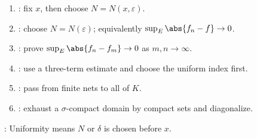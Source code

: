 \begin{method} \label{meth:uniform-convergence-proof-patterns-source-todo} 
\begin{enumerate}[label=(\roman*)]
\setlength{\itemsep}{0pt}
\item {}: fix $x$, then choose $N=N(x,\varepsilon)$.
\item {}: choose $N=N(\varepsilon)$; equivalently $\sup_E\abs{f_n-f}\to0$.
\item {}: prove $\sup_E\abs{f_n-f_m}\to0$ as $m,n\to\infty$.
\item {}: use a three-term estimate and choose the uniform index first.
\item {}: pass from finite nets to all of $K$.
\item {}: exhaust a $\sigma$-compact domain by compact sets and diagonalize.
\end{enumerate}
: Uniformity means $N$ or $\delta$ is chosen before $x$.
\end{method}
